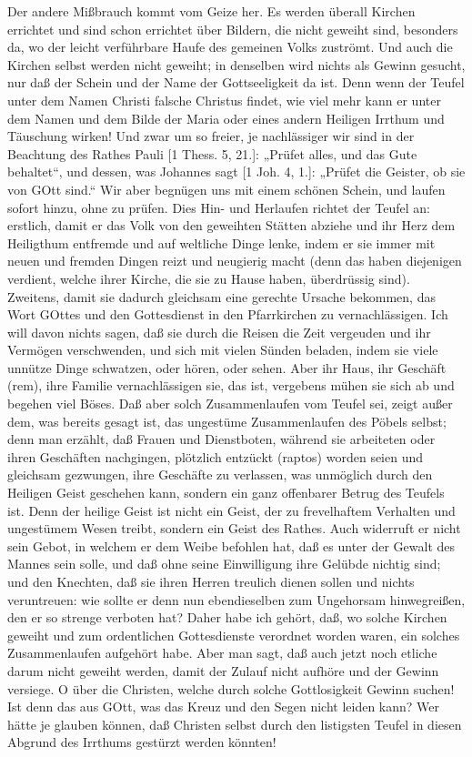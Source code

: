 Der andere Mißbrauch kommt vom Geize her. Es werden überall Kirchen errichtet und sind schon errichtet über Bildern, die nicht geweiht sind, besonders da, wo der leicht verführbare Haufe des gemeinen Volks zuströmt. Und auch die Kirchen selbst werden nicht geweiht; in denselben wird nichts als Gewinn gesucht, nur daß der Schein und der Name der Gottseeligkeit da ist. Denn wenn der Teufel unter dem Namen Christi falsche Christus findet, wie viel mehr kann er unter dem Namen und dem Bilde der Maria oder eines andern Heiligen Irrthum und Täuschung wirken! Und zwar um so freier, je nachlässiger wir sind in der Beachtung des Rathes Pauli [1 Thess. 5, 21.]: „Prüfet alles, und das Gute behaltet“, und dessen, was Johannes sagt [1 Joh. 4, 1.]: „Prüfet die Geister, ob sie von GOtt sind.“ Wir aber begnügen uns mit einem schönen Schein, und laufen sofort hinzu, ohne zu prüfen. Dies Hin- und Herlaufen richtet der Teufel an: erstlich, damit er das Volk von den geweihten Stätten abziehe und ihr Herz dem Heiligthum entfremde und auf weltliche Dinge lenke, indem er sie immer mit neuen und fremden Dingen reizt und neugierig macht (denn das haben diejenigen verdient, welche ihrer Kirche, die sie zu Hause haben, überdrüssig sind). Zweitens, damit sie dadurch gleichsam eine gerechte Ursache bekommen, das Wort GOttes und den Gottesdienst in den Pfarrkirchen zu vernachlässigen. Ich will davon nichts sagen, daß sie durch die Reisen die Zeit vergeuden und ihr Vermögen verschwenden, und sich mit vielen Sünden beladen, indem sie viele unnütze Dinge schwatzen, oder hören, oder sehen. Aber ihr Haus, ihr Geschäft (rem), ihre Familie vernachlässigen sie, das ist, vergebens mühen sie sich ab und begehen viel Böses. Daß aber solch Zusammenlaufen vom Teufel sei, zeigt außer dem, was bereits gesagt ist, das ungestüme Zusammenlaufen des Pöbels selbst; denn man erzählt, daß Frauen und Dienstboten, während sie arbeiteten oder ihren Geschäften nachgingen, plötzlich entzückt (raptos) worden seien und gleichsam gezwungen, ihre Geschäfte zu verlassen, was unmöglich durch den Heiligen Geist geschehen kann, sondern ein ganz offenbarer Betrug des Teufels ist. Denn der heilige Geist ist nicht ein Geist, der zu frevelhaftem Verhalten und ungestümem Wesen treibt, sondern ein Geist des Rathes. Auch widerruft er nicht sein Gebot, in welchem er dem Weibe befohlen hat, daß es unter der Gewalt des Mannes sein solle, und daß ohne seine Einwilligung ihre Gelübde nichtig sind; und den Knechten, daß sie ihren Herren treulich dienen sollen und nichts veruntreuen: wie sollte er denn nun ebendieselben zum Ungehorsam hinwegreißen, den er so strenge verboten hat? Daher habe ich gehört, daß, wo solche Kirchen geweiht und zum ordentlichen Gottesdienste verordnet worden waren, ein solches Zusammenlaufen aufgehört habe. Aber man sagt, daß auch jetzt noch etliche darum nicht geweiht werden, damit der Zulauf nicht aufhöre und der Gewinn versiege. O über die Christen, welche durch solche Gottlosigkeit Gewinn suchen! Ist denn das aus GOtt, was das Kreuz und den Segen nicht leiden kann? Wer hätte je glauben können, daß Christen selbst durch den listigsten Teufel in diesen Abgrund des Irrthums gestürzt werden könnten!

